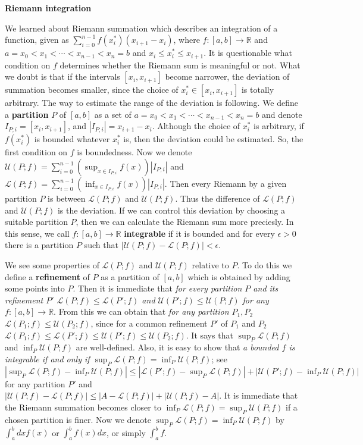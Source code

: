 \documentclass{article}
\newcommand{\ReR}{\mathbb{R}}
\begin{document}
\textbf{Riemann integration}

We learned about Riemann summation which describes an integration of a function, given as $\sum_{i = 0}^{n - 1} f(x^*_i) (x_{i + 1} - x_i)$, where $f : [a, b] \to \ReR$ and $a = x_0 < x_1 < \cdots < x_{n - 1} < x_n = b$ and $x_i \le x^*_i \le x_{i + 1}$.
It is questionable what condition on $f$ determines whether the Riemann sum is meaningful or not.
What we doubt is that if the intervals $[x_i, x_{i + 1}]$ become narrower, the deviation of summation becomes smaller, since the choice of $x^*_i \in [x_i, x_{i + 1}]$ is totally arbitrary.
The way to estimate the range of the deviation is following.
We define a \textbf{partition} $P$ of $[a, b]$ as a set of $a = x_0 < x_1 < \cdots < x_{n - 1} < x_n = b$ and denote $I_{P;i} = [x_i, x_{i + 1}]$, and $|I_{P;i}| = x_{i + 1} - x_i$.
Although the choice of $x^*_i$ is arbitrary, if $f(x^*_i)$ is bounded whatever $x^*_i$ is, then the deviation could be estimated.
So, the first condition on $f$ is boundedness.
Now we denote $\mathcal{U}(P; f) = \sum_{i = 0}^{n - 1} (\sup_{x \in I_{P;i}} f(x)) |I_{P;i}|$ and $\mathcal{L}(P; f) = \sum_{i = 0}^{n - 1} (\inf_{x \in I_{P;i}} f(x)) |I_{P;i}|$.
Then every Riemann by a given partition $P$ is between $\mathcal{L}(P; f)$ and $\mathcal{U}(P; f)$.
Thus the difference of $\mathcal{L}(P; f)$ and $\mathcal{U}(P; f)$ is the deviation.
If we can control this deviation by choosing a suitable partition $P$, then we can calculate the Riemann sum more preciesly.
In this sense, we call $f : [a, b] \to \ReR$ \textbf{integrable} if it is bounded and for every $\epsilon > 0$ there is a partition $P$ such that $|\mathcal{U}(P; f) - \mathcal{L}(P; f)| < \epsilon$.

We see some properties of $\mathcal{L}(P; f)$ and $\mathcal{U}(P; f)$ relative to $P$.
To do this we define a \textbf{refinement} of $P$ as a partition of $[a, b]$ which is obtained by adding some points into $P$.
Then it is immediate that \textit{for every partition $P$ and its refinement $P'$ $\mathcal{L}(P; f) \le \mathcal{L}(P'; f)$ and $\mathcal{U}(P'; f) \le \mathcal{U}(P; f)$ for any $f : [a, b] \to \ReR$}.
From this we can obtain that \textit{for any partition $P_1, P_2$ $\mathcal{L}(P_1; f) \le \mathcal{U}(P_2; f)$}, since for a common refinement $P'$ of $P_1$ and $P_2$ $\mathcal{L}(P_1; f) \le \mathcal{L}(P'; f) \le \mathcal{U}(P'; f) \le \mathcal{U}(P_2; f)$.
It says that $\sup_P \mathcal{L}(P; f)$ and $\inf_P \mathcal{U}(P; f)$ are well-defined.
Also, it is easy to show that \textit{a bounded $f$ is integrable if and only if $\sup_P \mathcal{L}(P; f) = \inf_P \mathcal{U}(P; f)$}; see $|\sup_P \mathcal{L}(P; f) - \inf_P \mathcal{U}(P; f)| \le |\mathcal{L}(P'; f) - \sup_P \mathcal{L}(P; f)| + |\mathcal{U}(P'; f) - \inf_P \mathcal{U}(P; f)|$for any partition $P'$ and $|\mathcal{U}(P; f) - \mathcal{L}(P; f)| \le |A - \mathcal{L}(P; f)| + |\mathcal{U}(P; f) - A|$.
It is immediate that the Riemann summation becomes closer to $\inf_P \mathcal{L}(P; f) = \sup_P \mathcal{U}(P; f)$ if a chosen partition is finer.
Now we denote $\sup_P \mathcal{L}(P; f) = \inf_P \mathcal{U}(P; f)$ by $\int_a^b dx f(x)$ or $\int_a^b f(x) dx$, or simply $\int_a^b f$.
\end{document}
